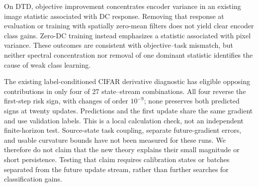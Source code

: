 On DTD, objective improvement concentrates encoder variance in an existing image statistic associated with DC response. Removing that response at evaluation or training with spatially zero-mean filters does not yield clear encoder class gains. Zero-DC training instead emphasizes a statistic associated with pixel variance. These outcomes are consistent with objective--task mismatch, but neither spectral concentration nor removal of one dominant statistic identifies the cause of weak class learning.

The existing label-conditioned CIFAR derivative diagnostic has eligible opposing contributions in only four of 27 state--stream combinations. All four reverse the first-step risk sign, with changes of order $10^{-9}$; none preserves both predicted signs at twenty updates. Predictions and the first update share the same gradient and use validation labels. This is a local calculation check, not an independent finite-horizon test. Source-state task coupling, separate future-gradient errors, and usable curvature bounds have not been measured for these runs. We therefore do not claim that the new theory explains their small magnitude or short persistence. Testing that claim requires calibration states or batches separated from the future update stream, rather than further searches for classification gains.
